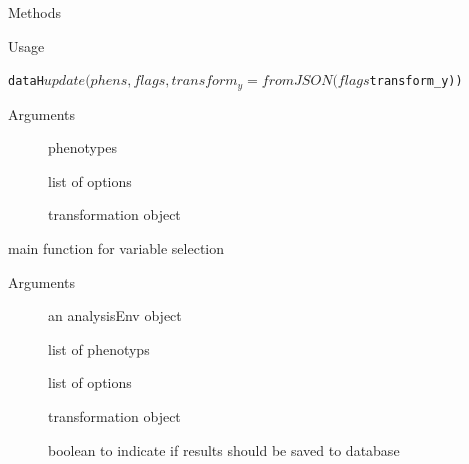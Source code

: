 \documentclass[letterpaper]{book}
\begin{document}
\begin{Section}{Methods}
\begin{SubSection}{}
\begin{SubSubSection}{Usage}
\begin{alltt}dataH$update(phens, flags, transform_y = fromJSON(flags$transform_y))\end{alltt}



\end{SubSubSection}

%
\begin{SubSubSection}{Arguments}

\begin{description}

\item[] phenotypes
\item[] list of options
\item[] transformation object

\end{description}



\end{SubSubSection}

\end{SubSection}




\hypertarget{method-dataH-select}{}
%
\begin{SubSection}{}
main function for variable selection
%

%
\begin{SubSubSection}{Arguments}

\begin{description}

\item[] an analysisEnv object
\item[] list of phenotyps
\item[] list of options
\item[] transformation object
\item[] boolean to indicate if results should be saved to database

\end{description}




\end{SubSubSection}
\end{SubSection}
\end{Section}
\end{document}
